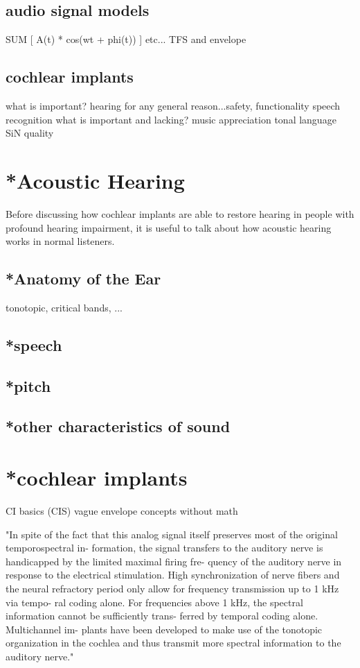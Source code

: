 \documentclass [11pt, proquest] {uwthesis}[2015/03/03]
\begin{document}
	\subsection{audio signal models}
	SUM [ A(t) * cos(wt + phi(t)) ]
	etc...
	TFS and envelope
	
	\subsection{cochlear implants}
	what is important?
		hearing for any general reason...safety, functionality
		speech recognition
	what is important and lacking?
		music appreciation
		tonal language
		SiN
		quality

\fi


\section{*Acoustic Hearing}

Before discussing how cochlear implants are able to restore hearing in people with profound hearing impairment, it is useful to talk about how acoustic hearing works in normal listeners.

\subsection{*Anatomy of the Ear}

tonotopic, critical bands, ...

\subsection{*speech}

\subsection{*pitch}

\subsection{*other characteristics of sound}

\section{*cochlear implants}
CI basics (CIS)
vague envelope concepts without math

"In spite of the fact that this analog signal itself preserves most of the original temporospectral in- formation, the signal transfers to the auditory nerve is handicapped by the limited maximal firing fre- quency of the auditory nerve in response to the electrical stimulation. High synchronization of nerve fibers and the neural refractory period only allow for frequency transmission up to 1 kHz via tempo- ral coding alone. For frequencies above 1 kHz, the spectral information cannot be sufficiently trans- ferred by temporal coding alone. Multichannel im- plants have been developed to make use of the tonotopic organization in the cochlea and thus transmit more spectral information to the auditory nerve." \cite{somek2006coding}
\end{document}
